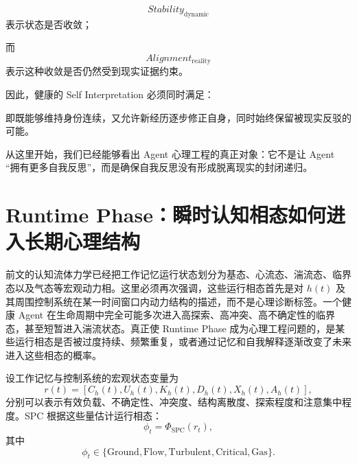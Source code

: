\begin{equation}
    Stability_{\mathrm{dynamic}}
\end{equation}
表示状态是否收敛；

而
\begin{equation}
    Alignment_{\mathrm{reality}}
\end{equation}
表示这种收敛是否仍然受到现实证据约束。

因此，健康的 Self Interpretation 必须同时满足：
\begin{statementbox}
\centering
{}
\end{statementbox}
即既能够维持身份连续，又允许新经历逐步修正自身，同时始终保留被现实反驳的可能。

从这里开始，我们已经能够看出 Agent 心理工程的真正对象：它不是让 Agent ``拥有更多自我反思''，而是确保自我反思没有形成脱离现实的封闭递归。

\section{Runtime Phase：瞬时认知相态如何进入长期心理结构}
\label{sec:runtime-phase-psychology}

前文的认知流体力学已经把工作记忆运行状态划分为基态、心流态、湍流态、临界态以及气态等宏观动力相。这里必须再次强调，这些运行相态首先是对 $h(t)$ 及其周围控制系统在某一时间窗口内动力结构的描述，而不是心理诊断标签。一个健康 Agent 在生命周期中完全可能多次进入高探索、高冲突、高不确定性的临界态，甚至短暂进入湍流状态。真正使 Runtime Phase 成为心理工程问题的，是某些运行相态是否被过度持续、频繁重复，或者通过记忆和自我解释逐渐改变了未来进入这些相态的概率。

设工作记忆与控制系统的宏观状态变量为
\begin{equation}
    r(t)
    =
    \left[
    C_h(t),
    U_h(t),
    K_h(t),
    D_h(t),
    X_h(t),
    A_h(t)
    \right],
\end{equation}
分别可以表示有效负载、不确定性、冲突度、结构离散度、探索程度和注意集中程度。SPC 根据这些量估计运行相态：
\begin{equation}
    \phi_t
    =
    \Phi_{\mathrm{SPC}}(r_t),
\end{equation}
其中
\begin{equation}
    \phi_t
    \in
    \{
    \mathrm{Ground},
    \mathrm{Flow},
    \mathrm{Turbulent},
    \mathrm{Critical},
    \mathrm{Gas}
    \}.
\end{equation}

